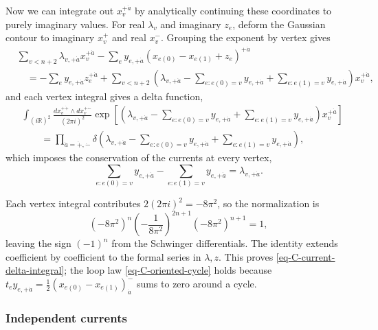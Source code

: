 \documentclass[11pt]{article}
\numberwithin{equation}{section}
\numberwithin{figure}{section}
\numberwithin{table}{section}
\begin{document}
Now we can integrate out $x_v^{+\dot a}$ by analytically continuing these coordinates to purely imaginary values. For real $\lambda_v$ and imaginary $z_e$, deform the Gaussian contour to imaginary $x_v^+$ and real $x_v^-$. Grouping the exponent by vertex gives~
\begin{equation}\label{eq-C-fourier-exponent}
\begin{aligned}
&\sum_{v<n+2}\lambda_{v,+\dot a}x_v^{+\dot a}
-\sum_ey_{e,+\dot a}(x_{e(0)}-x_{e(1)}+z_e)^{+\dot a}\\
&\quad=-\sum_ey_{e,+\dot a}z_e^{+\dot a}
+\sum_{v<n+2}\left(\lambda_{v,+\dot a}
-\sum_{e:e(0)=v}y_{e,+\dot a}
+\sum_{e:e(1)=v}y_{e,+\dot a}\right)x_v^{+\dot a},
\end{aligned}
\end{equation}
and each vertex integral gives a delta function,
\begin{equation}\label{eq-C-fourier-delta}
\begin{aligned}
&\int_{(i\mathbb R)^2}
\frac{dx_v^{+\dot+}\wedge dx_v^{+\dot-}}{(2\pi i)^2}
\exp\!\left[\left(\lambda_{v,+\dot a}
-\sum_{e:e(0)=v}y_{e,+\dot a}
+\sum_{e:e(1)=v}y_{e,+\dot a}\right)x_v^{+\dot a}\right]\\
&\qquad=\prod_{\dot a=\dot+,\dot-}
\delta\!\left(\lambda_{v,+\dot a}
-\sum_{e:e(0)=v}y_{e,+\dot a}
+\sum_{e:e(1)=v}y_{e,+\dot a}\right),
\end{aligned}
\end{equation}
which imposes the conservation of the currents at every vertex,
\begin{equation}\label{eq-1-9}
\sum_{e:e(0)=v}y_{e,+\dot a}
-\sum_{e:e(1)=v}y_{e,+\dot a}
=\lambda_{v,+\dot a}.
\end{equation}

Each vertex integral contributes $2(2\pi i)^2=-8\pi^2$, so the normalization is
\begin{equation*}
(-8\pi^2)^n\left(-\frac1{8\pi^2}\right)^{2n+1}(-8\pi^2)^{n+1}=1,
\end{equation*}
leaving the sign $(-1)^n$ from the Schwinger differentials. The identity extends coefficient by coefficient to the formal series in $\lambda,z$. This proves \eqref{eq-C-current-delta-integral}; the loop law \eqref{eq-C-oriented-cycle} holds because $t_ey_{e,+\dot a}=\frac12(x_{e(0)}-x_{e(1)})^-_{\dot a}$ sums to zero around a cycle.

\subsubsection*{Independent currents}\label{sec-B-network}
\end{document}
